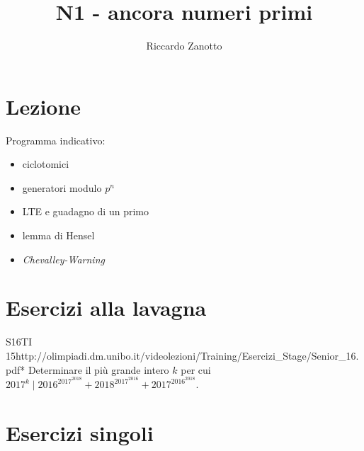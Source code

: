 \documentclass[12pt]{article}
\author{Riccardo Zanotto}
\title{N1 - ancora numeri primi}
\begin{document}
\maketitle


\section{Lezione}

Programma indicativo:

\begin{itemize}
    \item ciclotomici
    \item generatori modulo $p^n$
    \item LTE e guadagno di un primo
    \item lemma di Hensel
    \item \textit{Chevalley-Warning}
\end{itemize}

\section{Esercizi alla lavagna}

\begin{esercizio}{S16TI 15}{http://olimpiadi.dm.unibo.it/videolezioni/Training/Esercizi_Stage/Senior_16.pdf}{*}
    Determinare il più grande intero $k$ per cui $2017^k\mid 2016^{2017^{2018}}+2018^{2017^{2016}}+2017^{2016^{2018}}$.
\end{esercizio}

\section{Esercizi singoli}
\end{document}

